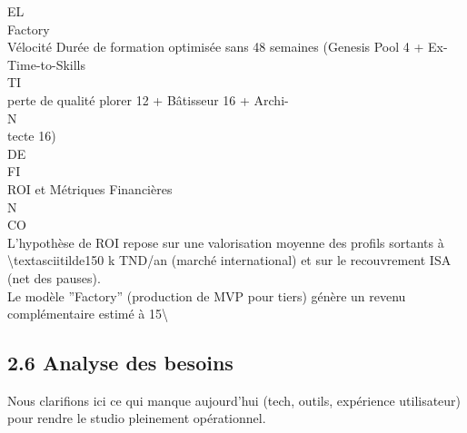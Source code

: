\documentclass[12pt,landscape,a4paper]{article}
\begin{document}
\vspace{0.5em}
EL\\
Factory\\
Vélocité                                  Durée de formation optimisée sans         48 semaines (Genesis Pool 4 + Ex-        Time-to-Skills\\
\vspace{0.5em}
\vspace{0.5em}
\vspace{0.5em}
\vspace{0.5em}
TI\\
perte de qualité                          plorer 12 + Bâtisseur 16 + Archi-\\
\vspace{0.5em}
\vspace{0.5em}
\vspace{0.5em}
\vspace{0.5em}
N\\
tecte 16)\\
\vspace{0.5em}
\vspace{0.5em}
\vspace{0.5em}
\vspace{0.5em}
DE\\
FI\\
ROI et Métriques Financières\\
\vspace{0.5em}
\vspace{0.5em}
N\\
CO\\
L’hypothèse de ROI repose sur une valorisation moyenne des profils sortants à \textbackslash{}textasciitilde{}150 k TND/an (marché international) et sur le recouvrement ISA (net des pauses).\\
Le modèle ”Factory” (production de MVP pour tiers) génère un revenu complémentaire estimé à 15\textbackslash{}%
\vspace{0.5em}
\vspace{0.5em}
\vspace{0.5em}
\subsection{2.6 Analyse des besoins}
Nous clarifions ici ce qui manque aujourd’hui (tech, outils, expérience utilisateur) pour rendre le studio pleinement opérationnel.\\
\vspace{0.5em}
\vspace{0.5em}
\end{document}

